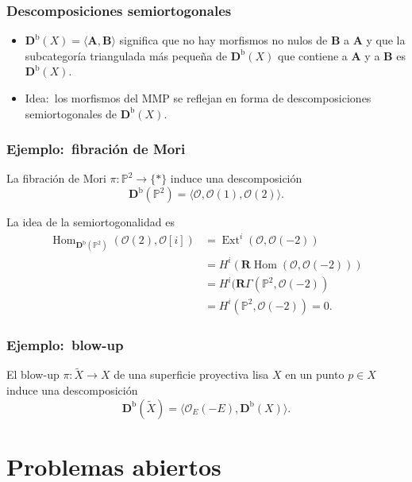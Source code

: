 \documentclass[12pt]{beamer}
\begin{document}
\begin{frame}
  \frametitle{Descomposiciones semiortogonales}
  \begin{itemize}
    \item $\mathbf{D}^{\mathrm{b}}(X) = \langle \mathbf{A}, \mathbf{B} \rangle$ significa que no hay morfismos no nulos de $\mathbf{B}$ a $\mathbf{A}$ y que la subcategoría triangulada más pequeña de $\mathbf{D}^{\mathrm{b}}(X)$ que contiene a $\mathbf{A}$ y a $\mathbf{B}$ es $\mathbf{D}^{\mathrm{b}}(X)$.
      \pause
    \item Idea:~los morfismos del MMP se reflejan en forma de descomposiciones semiortogonales de $\mathbf{D}^{\mathrm{b}}(X)$.
  \end{itemize}
\end{frame}

\begin{frame}
  \frametitle{Ejemplo:~fibración de Mori}
  La fibración de Mori $\pi \colon \mathbb{P}^{2} \to \{ * \}$ induce una descomposición
  \[ \mathbf{D}^{\mathrm{b}}(\mathbb{P}^{2}) = \langle \mathscr{O}, \mathscr{O}(1), \mathscr{O}(2) \rangle. \]
  \pause

  La idea de la semiortogonalidad es
  \begin{align*}
    \operatorname{Hom}_{\mathbf{D}^{\mathrm{b}}(\mathbb{P}^{2})}(\mathscr{O}(2),\mathscr{O}[i]) & = \operatorname{Ext}^{i}(\mathscr{O},\mathscr{O}(-2)) \\
    & = H^{i}(\mathbf{R}\operatorname{Hom}(\mathscr{O},\mathscr{O}(-2))) \\
    & = H^{i}(\mathbf{R}\Gamma(\mathbb{P}^{2},\mathscr{O}(-2)) \\
    & = H^{i}(\mathbb{P}^{2},\mathscr{O}(-2)) = 0.
  \end{align*}
\end{frame}

\begin{frame}
  \frametitle{Ejemplo:~blow-up}
  El blow-up $\pi \colon \tilde{X} \to X$ de una superficie proyectiva lisa $X$ en un punto $p \in X$ induce una descomposición
  \[ \mathbf{D}^{\mathrm{b}}(\tilde{X}) = \langle \mathscr{O}_{E}(-E), \mathbf{D}^{\mathrm{b}}(X) \rangle. \]
\end{frame}

\section{Problemas abiertos}
\end{document}
